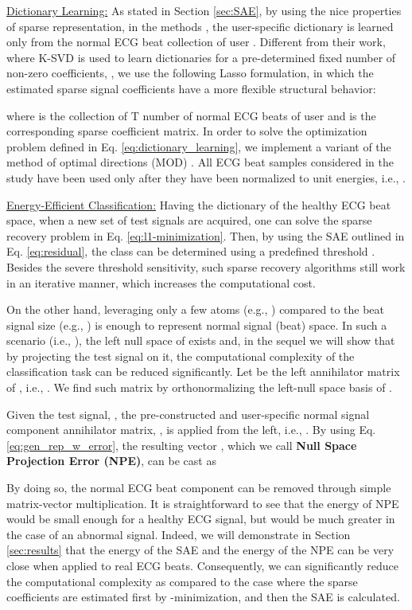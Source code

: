 \documentclass[journal,transmag]{IEEEtran}
\begin{document}
\underline{Dictionary Learning:} As stated in Section \ref{sec:SAE}, by using the nice properties of sparse representation, in the methods \cite{carrera2016ecg, carrera2019online}, the user-specific dictionary  is learned only from the normal ECG beat collection of user . Different from their work, where K-SVD is used to learn dictionaries for a pre-determined fixed number of non-zero coefficients, , we use the following Lasso formulation, in which the estimated sparse signal coefficients have a more flexible structural behavior:

where  is the collection of T number of normal ECG beats of user  and  is the corresponding sparse coefficient matrix. In order to solve the optimization problem defined in Eq. \eqref{eq:dictionary_learning}, we implement a variant of the method of optimal directions (MOD) \cite{MOD}. All ECG beat samples considered in the study have been used only after they have been normalized to unit energies, i.e.,  .

\underline{Energy-Efficient Classification:}
Having the dictionary  of the healthy ECG beat space, when a new set of test signals  are acquired, one can solve the sparse recovery problem in Eq. \eqref{eq:l1-minimization}. Then, by using the SAE outlined in Eq. \eqref{eq:residual}, the class can be determined using a predefined threshold \cite{carrera2016ecg}. Besides the severe threshold sensitivity, such sparse recovery algorithms still work in an iterative manner, which increases the computational cost.

On the other hand, leveraging only a few atoms (e.g., ) compared to the beat signal size (e.g., ) is enough to represent normal signal (beat) space. In such a scenario (i.e., ), the left null space of  exists and, in the sequel we will show that by projecting the test signal on it, the computational complexity of the classification task can be reduced significantly. Let   be the left annihilator matrix of , i.e., . We find such matrix by orthonormalizing the left-null space basis of .

Given the test signal, , the pre-constructed and user-specific normal signal component annihilator matrix, , is applied from the left, i.e., . By using Eq. \eqref{eq:gen_rep_w_error}, the resulting vector , which we call \textbf{Null Space Projection Error (NPE)}, can be cast as


By doing so, the normal ECG beat component can be removed through simple matrix-vector multiplication. It is straightforward to see that the energy of NPE would be small enough for a healthy ECG signal, but would be much greater in the case of an abnormal signal. Indeed, we will demonstrate in Section \ref{sec:results} that the energy of the SAE and the energy of the NPE can be very close when applied to real ECG beats. Consequently, we can significantly reduce the computational complexity as compared to the case where the sparse coefficients are estimated first by -minimization, and then the SAE is calculated.  
\end{document}
